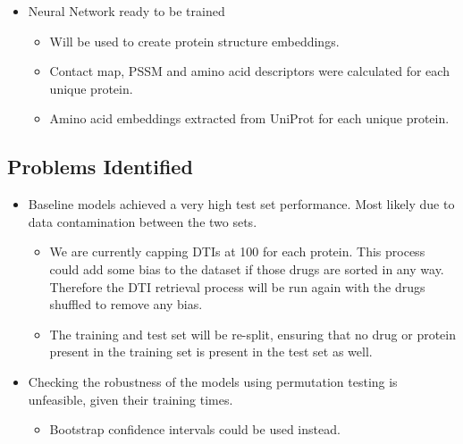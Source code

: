 \begin{itemize}
    \item
    Neural Network ready to be trained
    \begin{itemize}
        \item
        Will be used to create protein structure embeddings.
        \item
        Contact map, PSSM and amino acid descriptors were calculated for each unique protein.
        \item
        Amino acid embeddings extracted from UniProt for each unique protein.
    \end{itemize}

\end{itemize}

\subsection{Problems Identified}
\label{subsec:Problems Identified}

\begin{itemize}
        \item
        Baseline models achieved a very high test set performance. Most likely due to data contamination between the two sets.
        \begin{itemize}
            \item
            We are currently capping DTIs at 100 for each protein. This process could add some bias to the dataset if those drugs are sorted in any way. Therefore the DTI retrieval process will be run again with the drugs shuffled to remove any bias.
            \item
            The training and test set will be re-split, ensuring that no drug or protein present in the training set is present in the test set as well.
        \end{itemize}

        \item
        Checking the robustness of the models using permutation testing is unfeasible, given their training times.
        \begin{itemize}
            \item 
            Bootstrap confidence intervals could be used instead.
        \end{itemize}
\end{itemize}



